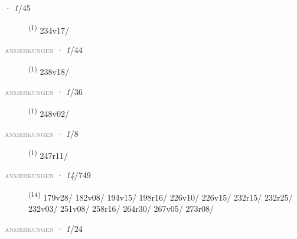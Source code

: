 \noindent{} · \textit{1}/45 \LEMMALINE
\begin{description}
    \item[]  \textsuperscript{(1)} \mbox{234v17/}
\end{description}
\textsc{\textcolor{gray}{anmerkungen}}
\ENTRYEND
\noindent{} · \textit{1}/44 \LEMMALINE
\begin{description}
    \item[]  \textsuperscript{(1)} \mbox{238v18/}
\end{description}
\textsc{\textcolor{gray}{anmerkungen}}
\ENTRYEND
\noindent{} · \textit{1}/36 \LEMMALINE
\begin{description}
    \item[]  \textsuperscript{(1)} \mbox{248v02/}
\end{description}
\textsc{\textcolor{gray}{anmerkungen}}
\ENTRYEND
\noindent{} · \textit{1}/8 \LEMMALINE
\begin{description}
    \item[]  \textsuperscript{(1)} \mbox{247r11/}
\end{description}
\textsc{\textcolor{gray}{anmerkungen}}
\ENTRYEND
\noindent{} · \textit{14}/749 \LEMMALINE
\begin{description}
    \item[]  \textsuperscript{(14)} \mbox{179v28/} \mbox{182v08/} \mbox{194v15/} \mbox{198r16/} \mbox{226v10/} \mbox{226v15/} \mbox{232r15/} \mbox{232r25/} \mbox{232v03/} \mbox{251v08/} \mbox{258r16/} \mbox{264r30/} \mbox{267v05/} \mbox{273r08/}
\end{description}
\textsc{\textcolor{gray}{anmerkungen}}
\ENTRYEND
\noindent{} · \textit{1}/24 \LEMMALINE
